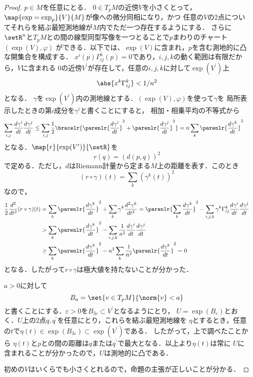 \documentclass[uplatex]{jsarticle}
\begin{document}
\begin{proof}
  $p\in M$を任意にとる．
  $0\in T_pM$の近傍$V$を小さくとって，$\map{\exp=\exp_p}{V}{M}$が像への微分同相になり，かつ
  任意の$V$の2点についてそれらを結ぶ最短測地線が$M$内でただ一つ存在するようにする．
  さらに$\setR^n$と$T_p M$との間の線型同型写像を一つとることで$p$まわりのチャート$(\exp(V), \varphi)$
  ができる．以下では、$\exp(V)$に含まれ，$p$を含む測地的に凸な開集合を構成する．
  $x^i(p)\Gamma_{ij}^k(p) = 0$であり，$i, j, k$の動く範囲は有限だから，$V$に含まれる
  0の近傍$V^\prime$が存在して，任意の$i, j, k$に対して$\exp(V^\prime)$上
    \[\abs{x^k\Gamma_{ij}^k} < 1 / n^2 \]
  となる．
  $\gamma$を$\exp(V^\prime)$内の測地線とする．$(\exp(V),\varphi)$を使って$\gamma$を
  局所表示したときの第$i$成分を$\gamma^i$と書くことにすると，
  相加・相乗平均の不等式から
  \begin{align*}
    \sum_{i, j} \frac{d\gamma^i}{dt} \frac{d\gamma^j}{dt} 
      &\leq \sum_{i, j} \frac{1}{2} \bracelr{\parenlr{\frac{d\gamma^i}{dt}}^2 + 
      \parenlr{\frac{d\gamma^j}{dt}}^2} = n\sum_k \parenlr{\frac{d\gamma^k}{dt}}^2
  \end{align*}
  となる．$\map{r}{\exp(V^\prime)}{\setR}$を
    \[r(q) = (d(p,q))^2 \]
  で定める．ただし，$d$はRiemann計量から定まる$M$上の距離を表す．このとき
  \[(r\circ \gamma)(t) = \sum_k (\gamma^k(t))^2\]
  なので，
  \begin{align*}
    \frac{1}{2}\frac{d^2}{dt^2}(r\circ \gamma)(t)
      &= \sum_k \parenlr{\frac{d\gamma^k}{dt}}^2 + \sum_k \gamma^k \frac{d^2\gamma^k}{dt^2} 
      = \parenlr{\sum_k\frac{d\gamma^k}{dt}}^2 - \sum_{i, j, k} \gamma^k \Gamma_{ij}^k\frac{d\gamma^i}{dt}\frac{d\gamma^j}{dt} \\
    &> \sum_k \parenlr{\frac{d\gamma^k}{dt}}^2 
      - \sum_{i,j,k} \frac{1}{n^2}\frac{d\gamma^i}{dt}\frac{d\gamma^j}{dt} \\
    &\geq \sum_k \parenlr{\frac{d\gamma^k}{dt}}^2 - n^2\sum_k\frac{1}{n^2}\parenlr{\frac{d\gamma^k}{dt}}^2  = 0
  \end{align*}
  となる．したがって$r\circ \gamma$は極大値を持たないことが分かった．
  
  $a>0$に対して
    \[B_a = \set{v\in T_p M}{\norm{v} < a} \]
  と書くことにする．$\varepsilon>0$を$B_{3\varepsilon} \subset V^\prime$となるようにとり，
  $U = \exp(B_\varepsilon)$とおく．$U$上の2点$q, q^\prime$を任意にとり，これらを結ぶ最短測地線を
  $\eta$とするとき，任意の$t$で$\eta(t)\in \exp(B_{3\varepsilon})\subset \exp(V^\prime)$である．
  したがって，上で調べたことから
  $\eta(t)$と$p$との間の距離は$q$または$q^\prime$で最大となる．以上より$\eta(t)$は常に
  $U$に含まれることが分かったので，$U$は測地的に凸である．

  初めの$V$はいくらでも小さくとれるので，命題の主張が正しいことが分かる．
\end{proof}
\end{document}
